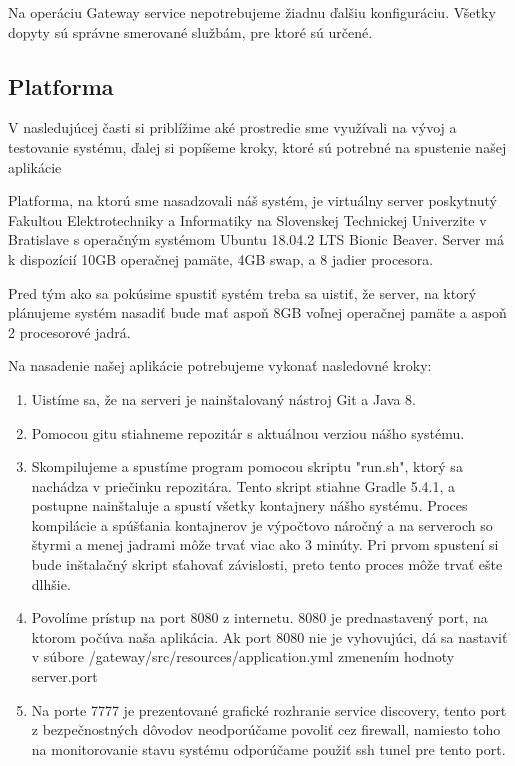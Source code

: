 Na operáciu Gateway service nepotrebujeme žiadnu ďalšiu konfiguráciu. Všetky dopyty sú správne smerované službám, pre ktoré sú určené.

\subsection{Platforma}
V nasledujúcej časti si priblížime aké prostredie sme využívali na vývoj a testovanie systému, ďalej si popíšeme kroky, ktoré sú potrebné na spustenie našej aplikácie

Platforma, na ktorú sme nasadzovali náš systém, je virtuálny server poskytnutý Fakultou Elektrotechniky a Informatiky na Slovenskej Technickej Univerzite v Bratislave s operačným systémom Ubuntu 18.04.2 LTS Bionic Beaver. Server má k dispozícií 10GB operačnej pamäte, 4GB swap, a 8 jadier procesora.

Pred tým ako sa pokúsime spustiť systém treba sa uistiť, že server, na ktorý plánujeme systém nasadiť bude mať aspoň 8GB voľnej operačnej pamäte a aspoň 2 procesorové jadrá.

Na nasadenie našej aplikácie potrebujeme vykonať nasledovné kroky:
\begin{enumerate}
    \item Uistíme sa, že na serveri je nainštalovaný nástroj Git a Java 8.
	\item Pomocou gitu stiahneme repozitár \cite{dp_repo} s aktuálnou verziou nášho systému.
    \item Skompilujeme a spustíme program pomocou skriptu "run.sh", ktorý sa nachádza v priečinku repozitára. Tento skript stiahne Gradle 5.4.1, a postupne nainštaluje a spustí všetky kontajnery nášho systému.
	Proces kompilácie a spúšťania kontajnerov je výpočtovo náročný a na serveroch so štyrmi a menej jadrami môže trvať viac ako 3 minúty. Pri prvom spustení si bude inštalačný skript sťahovať závislosti, preto tento proces môže trvať ešte dlhšie.
    \item Povolíme prístup na port 8080 z internetu. 8080 je prednastavený port, na ktorom počúva naša aplikácia. Ak port 8080 nie je vyhovujúci, dá sa nastaviť v súbore /gateway/src/resources/application.yml zmenením hodnoty server.port
    \item Na porte 7777 je prezentované grafické rozhranie service discovery, tento port z bezpečnostných dôvodov neodporúčame povoliť cez firewall, namiesto toho na monitorovanie stavu systému odporúčame použiť ssh tunel pre tento port.
\end{enumerate}



